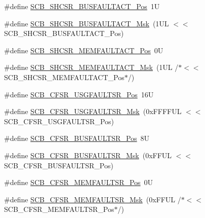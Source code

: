 \begin{DoxyCompactItemize}
\item 
\#define \mbox{\hyperlink{group___c_m_s_i_s___s_c_b_gaf272760f2df9ecdd8a5fbbd65c0b767a}{S\+C\+B\+\_\+\+S\+H\+C\+S\+R\+\_\+\+B\+U\+S\+F\+A\+U\+L\+T\+A\+C\+T\+\_\+\+Pos}}~1U
\item 
\#define \mbox{\hyperlink{group___c_m_s_i_s___s_c_b_ga9d7a8b1054b655ad08d85c3c535d4f73}{S\+C\+B\+\_\+\+S\+H\+C\+S\+R\+\_\+\+B\+U\+S\+F\+A\+U\+L\+T\+A\+C\+T\+\_\+\+Msk}}~(1\+U\+L $<$$<$ S\+C\+B\+\_\+\+S\+H\+C\+S\+R\+\_\+\+B\+U\+S\+F\+A\+U\+L\+T\+A\+C\+T\+\_\+\+Pos)
\item 
\#define \mbox{\hyperlink{group___c_m_s_i_s___s_c_b_ga7c856f79a75dcc1d1517b19a67691803}{S\+C\+B\+\_\+\+S\+H\+C\+S\+R\+\_\+\+M\+E\+M\+F\+A\+U\+L\+T\+A\+C\+T\+\_\+\+Pos}}~0U
\item 
\#define \mbox{\hyperlink{group___c_m_s_i_s___s_c_b_ga9147fd4e1b12394ae26eadf900a023a3}{S\+C\+B\+\_\+\+S\+H\+C\+S\+R\+\_\+\+M\+E\+M\+F\+A\+U\+L\+T\+A\+C\+T\+\_\+\+Msk}}~(1\+U\+L /$\ast$$<$$<$ S\+C\+B\+\_\+\+S\+H\+C\+S\+R\+\_\+\+M\+E\+M\+F\+A\+U\+L\+T\+A\+C\+T\+\_\+\+Pos$\ast$/)
\item 
\#define \mbox{\hyperlink{group___c_m_s_i_s___s_c_b_gac8e4197b295c8560e68e2d71285c7879}{S\+C\+B\+\_\+\+C\+F\+S\+R\+\_\+\+U\+S\+G\+F\+A\+U\+L\+T\+S\+R\+\_\+\+Pos}}~16U
\item 
\#define \mbox{\hyperlink{group___c_m_s_i_s___s_c_b_ga565807b1a3f31891f1f967d0fa30d03f}{S\+C\+B\+\_\+\+C\+F\+S\+R\+\_\+\+U\+S\+G\+F\+A\+U\+L\+T\+S\+R\+\_\+\+Msk}}~(0x\+F\+F\+F\+F\+U\+L $<$$<$ S\+C\+B\+\_\+\+C\+F\+S\+R\+\_\+\+U\+S\+G\+F\+A\+U\+L\+T\+S\+R\+\_\+\+Pos)
\item 
\#define \mbox{\hyperlink{group___c_m_s_i_s___s_c_b_ga555a24f4f57d199f91d1d1ab7c8c3c8a}{S\+C\+B\+\_\+\+C\+F\+S\+R\+\_\+\+B\+U\+S\+F\+A\+U\+L\+T\+S\+R\+\_\+\+Pos}}~8U
\item 
\#define \mbox{\hyperlink{group___c_m_s_i_s___s_c_b_ga26dc1ddfdc37a6b92597a6f7e498c1d6}{S\+C\+B\+\_\+\+C\+F\+S\+R\+\_\+\+B\+U\+S\+F\+A\+U\+L\+T\+S\+R\+\_\+\+Msk}}~(0x\+F\+F\+U\+L $<$$<$ S\+C\+B\+\_\+\+C\+F\+S\+R\+\_\+\+B\+U\+S\+F\+A\+U\+L\+T\+S\+R\+\_\+\+Pos)
\item 
\#define \mbox{\hyperlink{group___c_m_s_i_s___s_c_b_ga91f41491cec5b5acca3fbc94efbd799e}{S\+C\+B\+\_\+\+C\+F\+S\+R\+\_\+\+M\+E\+M\+F\+A\+U\+L\+T\+S\+R\+\_\+\+Pos}}~0U
\item 
\#define \mbox{\hyperlink{group___c_m_s_i_s___s_c_b_gad46716159a3808c9e7da22067d6bec98}{S\+C\+B\+\_\+\+C\+F\+S\+R\+\_\+\+M\+E\+M\+F\+A\+U\+L\+T\+S\+R\+\_\+\+Msk}}~(0x\+F\+F\+U\+L /$\ast$$<$$<$ S\+C\+B\+\_\+\+C\+F\+S\+R\+\_\+\+M\+E\+M\+F\+A\+U\+L\+T\+S\+R\+\_\+\+Pos$\ast$/)
$$
\end{DoxyCompactItemize}
